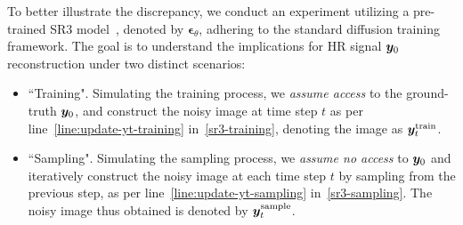 
To better illustrate the discrepancy, we conduct an experiment utilizing a pre-trained SR3 model~\cite{saharia2022image}, denoted by $\bm\epsilon_\theta$, adhering to the standard diffusion training framework. The goal is to understand the implications for HR signal ${\bm{y}}_0$ reconstruction under two distinct scenarios:
\begin{itemize}%
    \item ``Training". Simulating the training process, we \emph{assume access} to the ground-truth ${\bm{y}}_0$, and construct the noisy image at time step $t$ as per line~\ref{line:update-yt-training} in~\cref{sr3-training}, denoting the image as ${\bm{y}}_t^{\text{train}}$.
    \item ``Sampling". Simulating the sampling process, we \emph{assume no access} to ${\bm{y}}_0$ and iteratively construct the noisy image at each time step $t$ by sampling from the previous step, as per line~\ref{line:update-yt-sampling} in~\cref{sr3-sampling}. The noisy image thus obtained is denoted by ${\bm{y}}_t^{\text{sample}}$.
\end{itemize}

